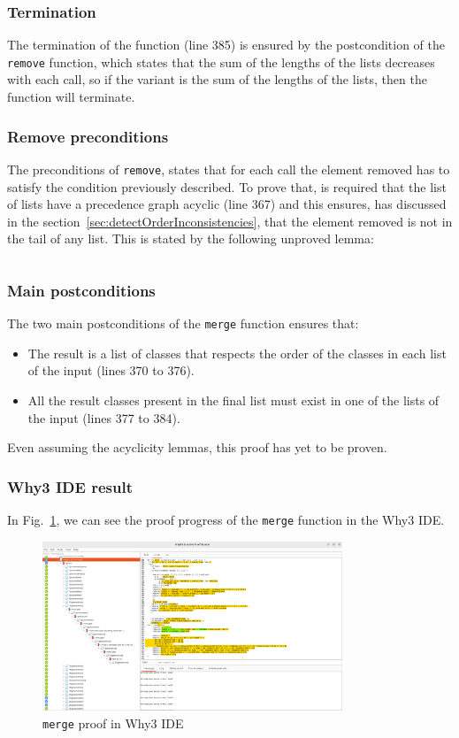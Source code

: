 \documentclass[runningheads]{llncs}
\begin{document}
\subsubsection{Termination}
The termination of the function (line 385) is ensured by the postcondition of the \texttt{remove} function, which states that the sum of the lengths of the lists decreases with each call, so if the variant is the sum of the lengths of the lists, then the function will terminate.
\subsubsection{Remove preconditions}
The preconditions of \texttt{remove}, states that for each call the element removed has to satisfy the condition previously described.
To prove that, is required that the list of lists have a precedence graph acyclic (line 367) and this ensures, has discussed in the section~\ref{sec:detectOrderInconsistencies}, 
that the element removed is not in the tail of any list. This is stated by the following unproved lemma:
\inputminted[firstline=198,lastline=203,fontsize=\small,linenos,xleftmargin=20pt]{ocaml}{../c3/cameleer/c3.ml}
\subsubsection{Main postconditions}
The two main postconditions of the \texttt{merge} function ensures that:
\begin{itemize}
  \item The result is a list of classes that respects the order of the classes in each list of the input (lines 370 to 376).
  \item All the result classes present in the final list must exist in one of the lists of the input (lines 377 to 384).
\end{itemize}
Even assuming the acyclicity lemmas, this proof has yet to be proven.
\subsubsection{Why3 IDE result}
In Fig.~\ref{fig:Why3Merge}, we can see the proof progress of the \texttt{merge} function in the Why3 IDE.
\begin{figure}[htbp]
  \centering
  \includegraphics[width=0.8\textwidth]{images/Why3merge.png}
  \caption{\texttt{merge} proof in Why3 IDE}
  \label{fig:Why3Merge}
\end{figure}
\end{document}
